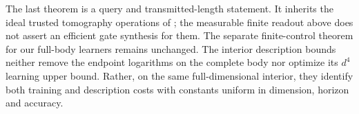 The last theorem is a query and transmitted-length statement.  It
inherits the ideal trusted tomography operations of \cite{MB67};
the measurable finite readout above does not assert an efficient gate
synthesis for them.  The separate finite-control theorem for our
full-body learners remains unchanged.  The interior description
bounds neither remove the endpoint logarithms on the complete body
nor optimize its $d^4$ learning upper bound.  Rather, on the same
full-dimensional interior, they identify both training and description
costs with constants uniform in dimension, horizon and accuracy.
